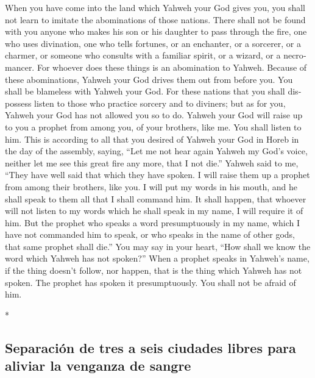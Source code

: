 \begin{paracol}{2}
\begin{otherlanguage}{english}
 When you have come into the land which Yahweh your God
gives you, you shall not learn to imitate the abominations of those
nations.  There shall not be found with you anyone who
makes his son or his daughter to pass through the fire, one who uses
divination, one who tells fortunes, or an enchanter, or a sorcerer,
 or a charmer, or someone who consults with a familiar
spirit, or a wizard, or a necromancer.  For whoever does
these things is an abomination to Yahweh. Because of these abominations,
Yahweh your God drives them out from before you.  You
shall be blameless with Yahweh your God.  For these
nations that you shall dispossess listen to those who practice sorcery
and to diviners; but as for you, Yahweh your God has not allowed you so
to do.  Yahweh your God will raise up to you a prophet
from among you, of your brothers, like me. You shall listen to him.
 This is according to all that you desired of Yahweh your
God in Horeb in the day of the assembly, saying, ``Let me not hear again
Yahweh my God's voice, neither let me see this great fire any more, that
I not die.''  Yahweh said to me, ``They have well said
that which they have spoken.  I will raise them up a
prophet from among their brothers, like you. I will put my words in his
mouth, and he shall speak to them all that I shall command him.
 It shall happen, that whoever will not listen to my
words which he shall speak in my name, I will require it of him.
 But the prophet who speaks a word presumptuously in my
name, which I have not commanded him to speak, or who speaks in the name
of other gods, that same prophet shall die.''  You may
say in your heart, ``How shall we know the word which Yahweh has not
spoken?''  When a prophet speaks in Yahweh's name, if the
thing doesn't follow, nor happen, that is the thing which Yahweh has not
spoken. The prophet has spoken it presumptuously. You shall not be
afraid of him.

\end{otherlanguage}

\switchcolumn[0]*

\hypertarget{separaciuxf3n-de-tres-a-seis-ciudades-libres-para-aliviar-la-venganza-de-sangre}{%
\subsection{Separación de tres a seis ciudades libres para aliviar la
venganza de
sangre}\label{separaciuxf3n-de-tres-a-seis-ciudades-libres-para-aliviar-la-venganza-de-sangre}}


\end{paracol}
